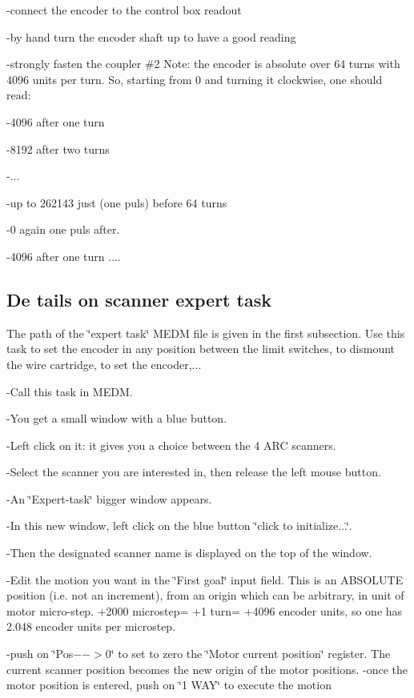 -connect the encoder to the control box readout 

-by hand turn the encoder shaft up to have a good reading 

-strongly fasten the coupler \#2 Note: the encoder is absolute over 64 turns
with 4096 units per turn. So, starting from 0 and turning it clockwise, one
should read: 

-4096 after one turn 

-8192 after two turns 

-... 

-up to 262143 just (one puls) before 64 turns 

-0 again one puls after. 

-4096 after one turn .... 


\subsection{De
tails on scanner expert task }

The path of the \char`\"{}expert task\char`\"{} MEDM file is
 given in the first subsection. 
 Use this task to set the encoder in any position between the limit switches,
to dismount the wire cartridge, to set the encoder,... 

-Call this task in MEDM. 

-You get a small window with a blue button. 

-Left click on it: it gives you a choice between the 4 ARC scanners. 

-Select the scanner you are interested in, then release the left mouse button. 

-An \char`\"{}Expert-task\char`\"{} bigger window appears. 

-In this new window, left click on the blue button \char`\"{}click to initialize...\char`\"{}. 

-Then the designated scanner name is displayed on the top of the window. 

-Edit the motion you want in the \char`\"{}First goal\char`\"{} input field.
This is an ABSOLUTE position (i.e. not an increment), from an origin which can
be arbitrary, in unit of motor micro-step. +2000 microstep= +1 turn= +4096 encoder
units, so one has 2.048 encoder units per microstep. 

-push on \char`\"{}Pos$-->$0\char`\"{} to set to zero the \char`\"{}Motor current
position\char`\"{} register. The current scanner position becomes the new origin
of the motor positions. -once the motor position is entered, push on \char`\"{}1
WAY\char`\"{} to execute the motion 

